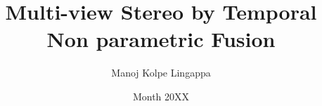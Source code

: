 \documentclass[thesis]{mas_report}
\author{Manoj Kolpe Lingappa}
\title{Multi-view Stereo by Temporal Non parametric Fusion}
\date{Month 20XX}
\begin{document}
	\frontmatter
	
	\begin{titlepage}
		\maketitle
	\end{titlepage}
	
	\cleardoublepage
	
	\pagestyle{plain}
	\cleardoublepage
	\statementpage
	
	
	
	
	
	\tableofcontents
	\listoffigures
	\listoftables
	
	\mainmatter %
	
	\pagestyle{mainmatter}
	
	
	
	
	
	
	
	
	
	\begin{appendices}
		
	\end{appendices}
	
	\backmatter
	
	
\end{document}
